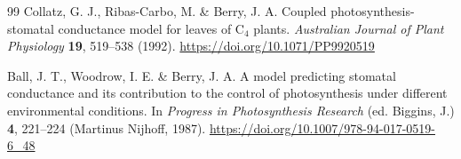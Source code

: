 \begin{thebibliography}{99}
Collatz, G. J., Ribas-Carbo, M. \& Berry, J. A.
Coupled photosynthesis-stomatal conductance model for leaves of C$_4$ plants.
\emph{Australian Journal of Plant Physiology} \textbf{19}, 519--538 (1992).
\url{https://doi.org/10.1071/PP9920519}

Ball, J. T., Woodrow, I. E. \& Berry, J. A.
A model predicting stomatal conductance and its contribution to the control of
photosynthesis under different environmental conditions. In \emph{Progress in
Photosynthesis Research} (ed. Biggins, J.) \textbf{4}, 221--224 (Martinus
Nijhoff, 1987). \url{https://doi.org/10.1007/978-94-017-0519-6_48}

\end{thebibliography}
